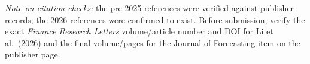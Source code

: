 \documentclass[11pt]{article}
\begin{document}
\bigskip
\noindent\emph{Note on citation checks:} the pre-2025 references were verified against publisher records;
the 2026 references were confirmed to exist. Before submission, verify the exact \emph{Finance Research
Letters} volume/article number and DOI for Li et al.\ (2026) and the final volume/pages for the Journal of
Forecasting item on the publisher page.
\end{document}
